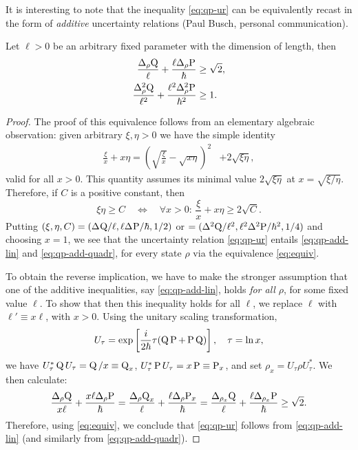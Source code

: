 It is interesting to note that the inequality \eqref{eq:qp-ur}  can be equivalently recast in the form of {\em additive} uncertainty relations (Paul Busch, personal communication).
\begin{thm}
Let $\ell>0$ be an arbitrary fixed parameter with the  dimension of length, then
\begin{align}
  \frac{\sdevr{\opq}}{\ell}+\frac{\ell\sdevr{\opp}}{\hbar}&\ge \sqrt2,\label{eq:qp-add-lin}\\
  \frac{\varr{\opq}}{\ell^2}+\frac{\ell^2\varr{\opp}}{\hbar^2}&\ge 1.\label{eq:qp-add-quadr}
\end{align}
\begin{proof}
The proof of this equivalence follows from an elementary algebraic observation: given arbitrary $\xi,\eta>0$ we have the simple identity
\begin{align}%
  \frac \xi x+x \eta=\left(\sqrt{\frac \xi x}-\sqrt{x \eta}\right)^2&+2\sqrt{\xi \eta},
\end{align}
valid for all $x>0$. This quantity assumes its  minimal value $2\sqrt{\xi \eta}$ at $x=\sqrt{\xi/ \eta}$. Therefore, if $C$ is a positive constant, then
\begin{equation}\label{eq:equiv}
  \xi\eta\ge C\quad\iff\quad\forall x>0:\,\frac\xi x+x\eta\ge 2\sqrt{C}.
\end{equation}
Putting
$(\xi,\eta,C)= (\sdev{\opq}/\ell,\ell\sdev{\opp}/\hbar,1/2)$ or $=(\var{\opq}/\ell^2,\ell^2\var{\opp}/\hbar^2,1/4)$ and choosing $x=1$, we see that the uncertainty relation \eqref{eq:qp-ur} entails  \eqref{eq:qp-add-lin} and \eqref{eq:qp-add-quadr}, for every state $\rho$ via the equivalence \eqref{eq:equiv}.

To obtain the reverse implication, we have to make the stronger assumption that one of the additive inequalities, say \eqref{eq:qp-add-lin}, holds {\em for all} $\rho$, for some fixed value $\ell$. To show that then this inequality holds for all $\ell$, we replace $\ell$ with $\ell'\equiv x\ell$,  with $x>0$. Using the unitary scaling transformation,
\begin{equation}
  U_\tau=\exp\left[\frac{i}{2\hbar} \tau(\operatorname{Q}\operatorname{P}+\operatorname{P}\operatorname{Q})\right],\quad \tau=\ln x,
\end{equation}
we have $U_\tau^* \operatorname{Q} U_\tau=\operatorname{Q}/x\equiv \operatorname{Q}_x$, $U_\tau^* \operatorname{P} U_\tau=x\operatorname{P}\equiv \operatorname{P}_x$, and set $\rho_x = U_\tau \rho U_\tau^*$. We then calculate:
\begin{align}
  \frac{\sdevr{\opq}}{x\ell}+\frac{x\ell\sdevr{\opp}}{\hbar}=
  \frac{\sdevr{\opq_x}}{\ell}+\frac{\ell\sdevr{\opp_x}}{\hbar}
  =\frac{\sdev[\rho_x]{\opq} }{\ell}+\frac{\ell\sdev[\rho_x]{\opp}}{\hbar}\ge \sqrt{2}.
\end{align}
Therefore, using \eqref{eq:equiv}, we conclude that \eqref{eq:qp-ur} follows from \eqref{eq:qp-add-lin} (and similarly from \eqref{eq:qp-add-quadr}).
\end{proof}
\end{thm}
